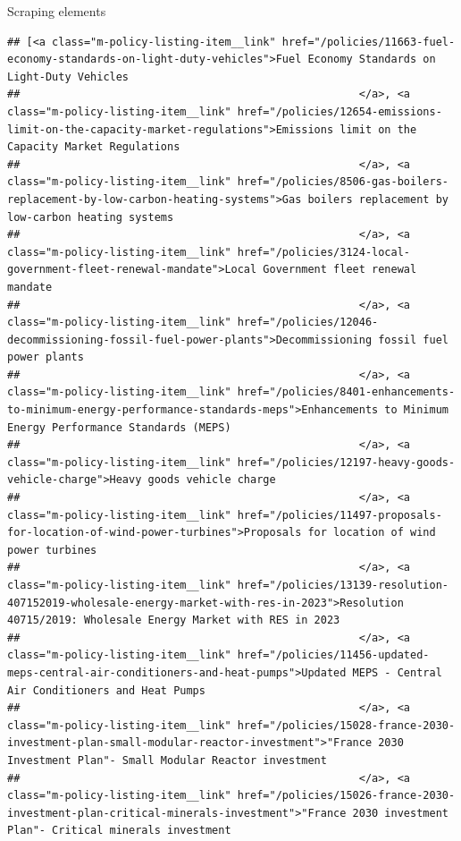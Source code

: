 \documentclass[
  10pt,
  ignorenonframetext,
  aspectratio=169]{beamer}
\begin{document}
\begin{frame}[fragile]{Scraping elements}
\begin{verbatim}
## [<a class="m-policy-listing-item__link" href="/policies/11663-fuel-economy-standards-on-light-duty-vehicles">Fuel Economy Standards on Light-Duty Vehicles
##                                                     </a>, <a class="m-policy-listing-item__link" href="/policies/12654-emissions-limit-on-the-capacity-market-regulations">Emissions limit on the Capacity Market Regulations
##                                                     </a>, <a class="m-policy-listing-item__link" href="/policies/8506-gas-boilers-replacement-by-low-carbon-heating-systems">Gas boilers replacement by low-carbon heating systems
##                                                     </a>, <a class="m-policy-listing-item__link" href="/policies/3124-local-government-fleet-renewal-mandate">Local Government fleet renewal mandate
##                                                     </a>, <a class="m-policy-listing-item__link" href="/policies/12046-decommissioning-fossil-fuel-power-plants">Decommissioning fossil fuel power plants
##                                                     </a>, <a class="m-policy-listing-item__link" href="/policies/8401-enhancements-to-minimum-energy-performance-standards-meps">Enhancements to Minimum Energy Performance Standards (MEPS)
##                                                     </a>, <a class="m-policy-listing-item__link" href="/policies/12197-heavy-goods-vehicle-charge">Heavy goods vehicle charge
##                                                     </a>, <a class="m-policy-listing-item__link" href="/policies/11497-proposals-for-location-of-wind-power-turbines">Proposals for location of wind power turbines
##                                                     </a>, <a class="m-policy-listing-item__link" href="/policies/13139-resolution-407152019-wholesale-energy-market-with-res-in-2023">Resolution 40715/2019: Wholesale Energy Market with RES in 2023
##                                                     </a>, <a class="m-policy-listing-item__link" href="/policies/11456-updated-meps-central-air-conditioners-and-heat-pumps">Updated MEPS - Central Air Conditioners and Heat Pumps
##                                                     </a>, <a class="m-policy-listing-item__link" href="/policies/15028-france-2030-investment-plan-small-modular-reactor-investment">"France 2030 Investment Plan"- Small Modular Reactor investment
##                                                     </a>, <a class="m-policy-listing-item__link" href="/policies/15026-france-2030-investment-plan-critical-minerals-investment">"France 2030 investment Plan"- Critical minerals investment

\end{verbatim}
\end{frame}
\end{document}
